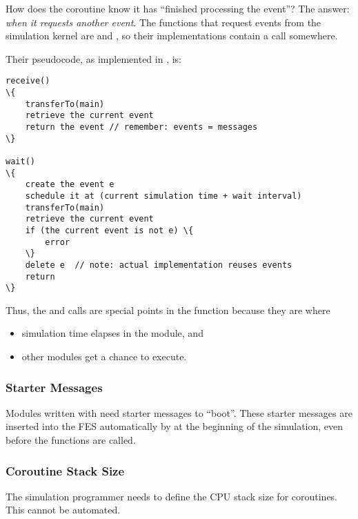 How does the coroutine know it has ``finished processing the event''?
The answer: \textit{when it requests another event}.  The functions
that request events from the simulation kernel are  and
, so their
implementations contain a  call
somewhere.


Their pseudocode, as implemented in {\opp}, is:


\begin{Verbatim}[commandchars=\\\{\}]
receive()
\{
    transferTo(main)
    retrieve the current event
    return the event // remember: events = messages
\}

wait()
\{
    create the event e
    schedule it at (current simulation time + wait interval)
    transferTo(main)
    retrieve the current event
    if (the current event is not e) \{
        error
    \}
    delete e  // note: actual implementation reuses events
    return
\}
\end{Verbatim}



Thus, the  and  calls are
special points in the  function because
they are where

\begin{itemize}
  \item simulation time elapses in the module, and
  \item other modules get a chance to execute.
\end{itemize}


\subsubsection{Starter Messages}
\label{simple-modules:activity:starter-messages}

Modules written with  need starter
messages to ``boot''.  These starter messages
are inserted into the FES automatically by {\opp} at the
beginning of the simulation, even before the 
functions are called.


\subsubsection{Coroutine Stack Size}
\label{sec:simple-modules:activity:stack-size}

The simulation programmer needs to define the CPU stack size
for coroutines. This cannot be automated.

